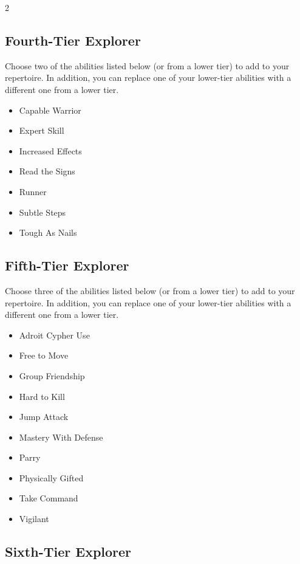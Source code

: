 \begin{multicols}{2}
\subsection{Fourth-Tier Explorer}

Choose two of the abilities listed below (or from a lower tier) to add to your repertoire. In addition, you can replace one of your lower-tier abilities with a different one from a lower tier.

\begin{itemize}
\item Capable Warrior
\item Expert Skill
\item Increased Effects
\item Read the Signs
\item Runner
\item Subtle Steps
\item Tough As Nails
\end{itemize}

\subsection{Fifth-Tier Explorer}

Choose three of the abilities listed below (or from a lower tier) to add to your repertoire. In addition, you can replace one of your lower-tier abilities with a different one from a lower tier.

\begin{itemize}
\item Adroit Cypher Use
\item Free to Move
\item Group Friendship
\item Hard to Kill
\item Jump Attack
\item Mastery With Defense
\item Parry
\item Physically Gifted
\item Take Command
\item Vigilant
\end{itemize}

\subsection{Sixth-Tier Explorer}


\end{multicols}
